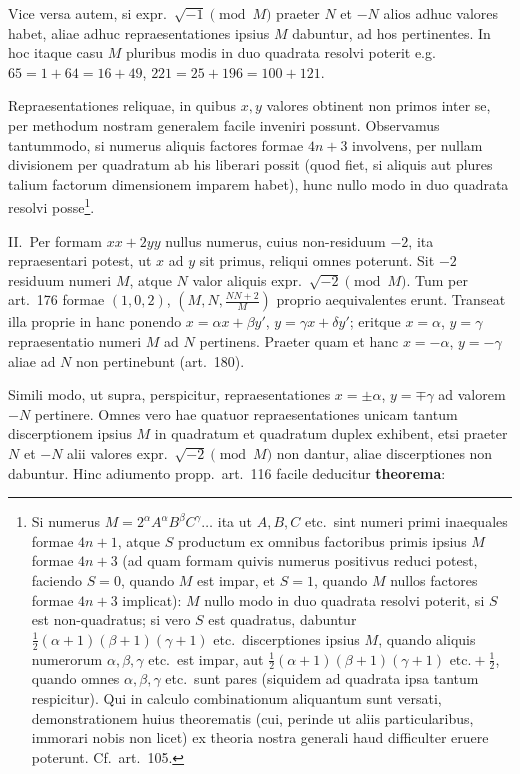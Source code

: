 \documentclass[12pt,a4paper]{article}
\theoremstyle{plain}
\theoremstyle{definition}
\theoremstyle{remark}
\begin{document}
Vice versa autem, si expr.\ $\sqrt{-1}\pmod{M}$ praeter $N$ et $-N$ alios adhuc valores habet, aliae adhuc repraesentationes ipsius $M$ dabuntur, ad hos pertinentes. In hoc itaque casu $M$ pluribus modis in duo quadrata resolvi poterit e.g.\ $65=1+64=16+49$, $221=25+196=100+121$.

Repraesentationes reliquae, in quibus $x,y$ valores obtinent non primos inter se, per methodum nostram generalem facile inveniri possunt. Observamus tantummodo, si numerus aliquis factores formae $4n+3$ involvens, per nullam divisionem per quadratum ab his liberari possit (quod fiet, si aliquis aut plures talium factorum dimensionem imparem habet), hunc nullo modo in duo quadrata resolvi posse\footnote{Si numerus $M=2^\alpha A^\alpha B^\beta C^\gamma\ldots$ ita ut $A,B,C$ etc.\ sint numeri primi inaequales formae $4n+1$, atque $S$ productum ex omnibus factoribus primis ipsius $M$ formae $4n+3$ (ad quam formam quivis numerus positivus reduci potest, faciendo $S=0$, quando $M$ est impar, et $S=1$, quando $M$ nullos factores formae $4n+3$ implicat): $M$ nullo modo in duo quadrata resolvi poterit, si $S$ est non-quadratus; si vero $S$ est quadratus, dabuntur $\frac{1}{2}(\alpha+1)(\beta+1)(\gamma+1)$ etc.\ discerptiones ipsius $M$, quando aliquis numerorum $\alpha,\beta,\gamma$ etc.\ est impar, aut $\frac{1}{2}(\alpha+1)(\beta+1)(\gamma+1)\text{ etc.}+\frac{1}{2}$, quando omnes $\alpha,\beta,\gamma$ etc.\ sunt pares (siquidem ad quadrata ipsa tantum respicitur). Qui in calculo combinationum aliquantum sunt versati, demonstrationem huius theorematis (cui, perinde ut aliis particularibus, immorari nobis non licet) ex theoria nostra generali haud difficulter eruere poterunt. Cf.\ art.\ 105.}.

II.\ Per formam $xx+2yy$ nullus numerus, cuius non-residuum $-2$, ita repraesentari potest, ut $x$ ad $y$ sit primus, reliqui omnes poterunt. Sit $-2$ residuum numeri $M$, atque $N$ valor aliquis expr.\ $\sqrt{-2}\pmod{M}$. Tum per art.\ 176 formae $(1,0,2)$, $(M,N,\frac{NN+2}{M})$ proprio aequivalentes erunt. Transeat illa proprie in hanc ponendo $x=\alpha x+\beta y'$, $y=\gamma x+\delta y'$; eritque $x=\alpha$, $y=\gamma$ repraesentatio numeri $M$ ad $N$ pertinens. Praeter quam et hanc $x=-\alpha$, $y=-\gamma$ aliae ad $N$ non pertinebunt (art.\ 180).

Simili modo, ut supra, perspicitur, repraesentationes $x=\pm\alpha$, $y=\mp\gamma$ ad valorem $-N$ pertinere. Omnes vero hae quatuor repraesentationes unicam tantum discerptionem ipsius $M$ in quadratum et quadratum duplex exhibent, etsi praeter $N$ et $-N$ alii valores expr.\ $\sqrt{-2}\pmod{M}$ non dantur, aliae discerptiones non dabuntur. Hinc adiumento propp.\ art.\ 116 facile deducitur \textbf{theorema}:
\end{document}
